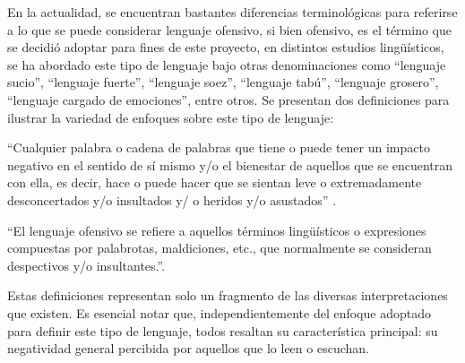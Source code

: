 En la actualidad, se encuentran bastantes diferencias terminológicas para referirse a lo que se puede considerar lenguaje ofensivo, si bien ofensivo, es el término que se decidió adoptar para fines de este proyecto, en distintos estudios lingüísticos, se ha abordado este tipo de lenguaje bajo otras denominaciones como ``lenguaje sucio'', ``lenguaje fuerte'', ``lenguaje soez'', ``lenguaje tabú'', ``lenguaje grosero'', ``lenguaje cargado de emociones'', entre otros.
Se presentan dos definiciones para ilustrar la variedad de enfoques sobre este tipo de lenguaje:

``Cualquier palabra o cadena de palabras que tiene o puede tener un impacto negativo en el sentido de sí mismo y/o el bienestar de aquellos que se encuentran con ella, es decir, hace o puede hacer que se sientan leve o extremadamente desconcertados y/o insultados y/ o heridos y/o asustados'' \cite[p. 16]{o2020offensive}.


``El lenguaje ofensivo se refiere a aquellos términos lingüísticos o expresiones compuestas por palabrotas, maldiciones, etc., que normalmente se consideran despectivos y/o insultantes.''\cite[p. 28]{avila2016treatment}.

Estas definiciones representan solo un fragmento de las diversas interpretaciones que existen. Es esencial notar que, independientemente del enfoque adoptado para definir este tipo de lenguaje, todos resaltan su característica principal: su negatividad general percibida por aquellos que lo leen o escuchan.


